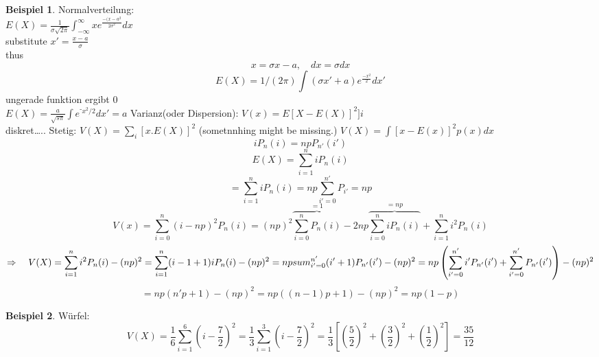 \documentclass[a4paper]{article}
\theoremstyle{definition}
\newtheorem{beispiel}{Beispiel}
\theoremstyle{remark}
\begin{document}
\begin{beispiel}
  
 Normalverteilung:\\

  $E(X)= \frac{1}{\sigma \sqrt{2\pi }}\int_{-\infty}^{\infty}xe^{\frac{-(x-a^2}{2\sigma ^2}}dx$\\
    substitute
    $x'=\frac{x-a}{\sigma }$ \\
    thus
    \begin{equation}
      x=\sigma x-a , \quad dx=\sigma dx
    \end{equation}
    \begin{equation}
   E(X)=1/(2\pi)\int (\sigma x'+a)e^{\frac{-x^2}{2}}dx'
    \end{equation}
    ungerade funktion ergibt 0\\
    $E(X)=\frac{a}{\sqrt{s\pi}}\int e^{⁻x^2/2}dx'=a$
  Varianz(oder Dispersion): $V(x)=E[X-E(X)]^2]i$\\
  diskret\dots..
  Stetig: $V(X)=\sum_i[x.E(X)]^2$ (sometnnhing might be missing.)
 $ V(X)=\int [x-E(x)]^2 p(x)dx$
 \begin{equation}
   iP_n(i)=npP_{n'}(i')
 \end{equation}
 \begin{equation}
   E(X)=\sum_{i=1}^{n}iP_n(i)
 \end{equation}
\begin{equation}
  = \sum_{i=1}^{n}iP_n(i)=np\sum_{i'=0}^{n'}	P_{i'}=np
\end{equation}
\begin{equation}
  V(x)=\sum_{i=0}^{n}(i-np)^2P_n(i)=(np)^2\overbrace{\sum_{i=0}^{n}P_n(i)}^{=1} -2np\overbrace{\sum_{i=0}^{n}iP_n(i)}^{=np} + \sum_{i=1}^{n}i^2P_n(i)
\end{equation}
\begin{equation}
  \Rightarrow \quad V(X)=\sum_{i=1}^{n}i^2P_n(i)-(np)^2 = \sum_{i=1}^{n}(i-1+1)iP_n(i)-(np)^2= np\\sum_{i'=0}^{n'}(i'+1)P_{n'}(i') -(np)^2 = np\left( \sum_{i'=0}^{n'}i'P_{n'}(i')+\sum_{i'=0}^{n'}P_{n'}(i') \right)-(np)^2
\end{equation}
\begin{equation}
  = np(n'p +1) -(np)^2= np\left( (n-1)p+1\right)-(np)^2=np(1-p)
\end{equation}
\end{beispiel}
 \begin{beispiel}
   Würfel: 
   \begin{equation}
     V(X)= \frac{1}{6}\sum_{i=1}^{6}(i-\frac{7}{2})^2= \frac{1}{3}\sum_{i=1}^{3}(i-\frac{7}{2})^2=\frac{1}{3}\left[ (\frac{5}{2})^2 + \left( \frac{3}{2} \right)^2+\left( \frac{1}{2} \right)^2 \right]=\frac{35}{12}
   \end{equation}

 \end{beispiel} 
\end{document}
